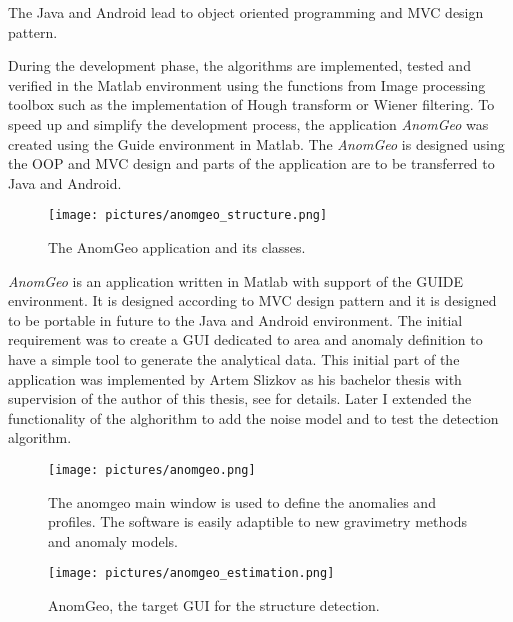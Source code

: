 \documentclass[FM]{tulthesis}
\begin{document}
The Java and Android lead to object oriented programming and MVC design pattern. 

During the development phase, the algorithms are implemented, tested and verified in the Matlab environment using the functions from Image processing toolbox such as the implementation of Hough transform or Wiener filtering. To speed up and simplify the development process, the application \emph{AnomGeo} was created using the Guide environment in Matlab. The \emph{AnomGeo} is designed using the OOP and MVC design and parts of the application are to be transferred to Java and Android. 

\begin{figure}[ht]
\centerline{\texttt{[image: pictures/anomgeo\_structure.png]}}
\renewcommand{\figurename}{Figure}
\caption[AnomGeo software, object model]{The AnomGeo application and its classes.}
\label{fig:AnomGeoArch}
\end{figure}


\emph{AnomGeo} is an application written in Matlab with support of the GUIDE environment. It is designed according to MVC design pattern and it is designed to be portable in future to the Java and Android environment. The initial requirement was to create a GUI dedicated to area and anomaly definition to have a simple tool to generate the analytical data. This initial part of the application was implemented by Artem Slizkov as his bachelor thesis with supervision of the author of this thesis, see \cite{Slizkov} for details. Later I extended the functionality of the alghorithm to add the noise model and to test the detection algorithm.

\begin{figure}[ht]
\centerline{\texttt{[image: pictures/anomgeo.png]}}
\renewcommand{\figurename}{Figure}
\caption[AnomGeo software, main window]{The anomgeo main window is used to define the anomalies and profiles. The software is easily adaptible to new gravimetry methods and anomaly models.}
\label{fig:AnomGeoMain}
\end{figure}

\begin{figure}[ht]
\centerline{\texttt{[image: pictures/anomgeo\_estimation.png]}}
\renewcommand{\figurename}{Figure}
\caption[AnomGeo software, estimation GUI]{AnomGeo, the target GUI for the structure detection.}
\label{fig:AnomGeoEstimation}
\end{figure}
\end{document}
